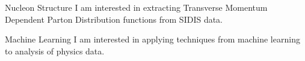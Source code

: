 
\begin{cvskills}

  \cvskill
    {Nucleon Structure} %
    {I am interested in extracting Transverse Momentum Dependent Parton Distribution functions from SIDIS data.}

  \cvskill
        {Machine Learning}
        {I am interested in applying techniques from machine learning to analysis of physics data.}

\end{cvskills}

